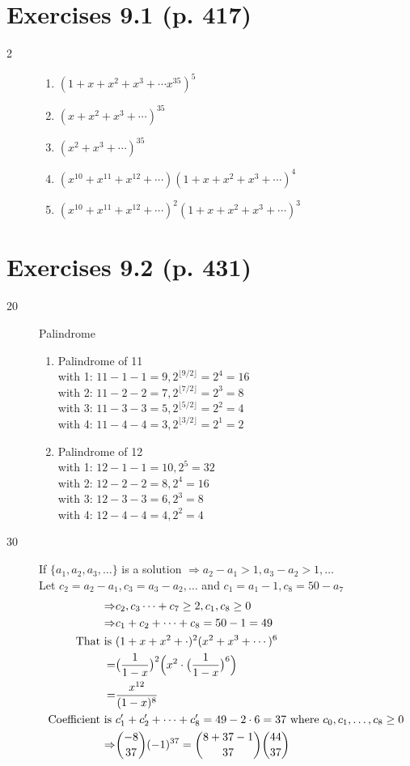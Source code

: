 \documentclass[a4paper]{article}
\begin{document}
\section*{Exercises 9.1 (p. 417) }
\begin{description}
\item [2]
\begin{enumerate}[label=(\alph*)]
    \item $(1+x+x^2+x^3+\cdots x^{35})^5$
    \item $(x+x^2+x^3+\cdots)^35$
    \item $(x^2+x^3+\cdots)^35$
    \item $(x^{10}+x^{11}+x^{12}+\cdots)(1+x+x^2+x^3+\cdots)^4$
    \item $(x^{10}+x^{11}+x^{12}+\cdots)^2(1+x+x^2+x^3+\cdots)^3$
\end{enumerate}
\end{description}
    
\section*{Exercises 9.2 (p. 431) }
\begin{description}
\item[20] Palindrome
\begin{enumerate}[label=(\alph*)]
    \item Palindrome of 11\\
    with 1: $11-1-1=9, 2^{\lfloor9/2\rfloor}=2^4=16$\\
    with 2: $11-2-2=7, 2^{\lfloor7/2\rfloor}=2^3=8$\\
    with 3: $11-3-3=5, 2^{\lfloor5/2\rfloor}=2^2=4$\\
    with 4: $11-4-4=3, 2^{\lfloor3/2\rfloor}=2^1=2$
    \item Palindrome of 12\\
    with 1: $12-1-1=10, 2^5=32$\\
    with 2: $12-2-2=8, 2^4=16$\\
    with 3: $12-3-3=6, 2^3=8$\\
    with 4: $12-4-4=4, 2^2=4$
\end{enumerate}
\item [30]
If $\{a_1,a_2,a_3,\ldots\}$ is a solution $\Rightarrow a_2-a_1>1,a_3-a_2>1,\ldots$\\
Let $c_2=a_2-a_1, c_3=a_3-a_2, \ldots$ and $c_1=a_1-1, c_8=50-a_7$
\begin{align*}
    \Rightarrow&c_2,c_3\cdots+c_7\geq2, c_1,c_8\geq0\\
    \Rightarrow&c_1+c_2+\cdots+c_8=50-1=49\\
    \text{That is }&(1+x+x^2+\cdot)^2(x^2+x^3+\cdots)^6\\
    =&\bigl(\frac{1}{1-x}\bigr)^2\Bigl(x^2\cdot\bigl(\frac{1}{1-x}\bigr)^6\Bigr)\\
    =&\frac{x^{12}}{(1-x)^8}\\
    \text{Coefficient is }&c_1'+c_2'+\cdots+c_8'=49-2\cdot6=37\text{ where }c_0,c_1,\ldots,c_8\geq 0\\
    \Rightarrow&\binom{-8}{37}(-1)^{37}=\binom{8+37-1}{37}\binom{44}{37}
\end{align*}
\end{description}
\end{document}
